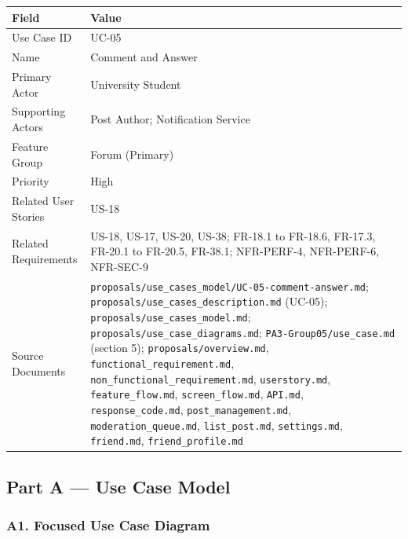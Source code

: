 \documentclass[12pt]{article}
\renewcommand{\baselinestretch}{1.5}
\begin{document}
\begingroup
\small
\renewcommand{\baselinestretch}{1.0}\selectfont
\renewcommand{\arraystretch}{1.15}
\setlength{\tabcolsep}{6pt}
\begin{longtable}{|>{\raggedright\arraybackslash}p{}|>{\raggedright\arraybackslash}p{}|}
\hline
\textbf{Field} & \textbf{Value} \\ \hline
\endhead
Use Case ID & UC-05 \\ \hline
Name & Comment and Answer \\ \hline
Primary Actor & University Student \\ \hline
Supporting Actors & Post Author; Notification Service \\ \hline
Feature Group & Forum (Primary) \\ \hline
Priority & High \\ \hline
Related User Stories & US-18 \\ \hline
Related Requirements & US-18, US-17, US-20, US-38; FR-18.1 to FR-18.6, FR-17.3, FR-20.1 to FR-20.5, FR-38.1; NFR-PERF-4, NFR-PERF-6, NFR-SEC-9 \\ \hline
Source Documents & \texttt{proposals/use\_cases\_model/UC-05-comment-answer.md}; \texttt{proposals/use\_cases\_description.md} (UC-05); \texttt{proposals/use\_cases\_model.md}; \texttt{proposals/use\_case\_diagrams.md}; \texttt{PA3-Group05/use\_case.md} (section 5); \texttt{proposals/overview.md}, \texttt{functional\_requirement.md}, \texttt{non\_functional\_requirement.md}, \texttt{userstory.md}, \texttt{feature\_flow.md}, \texttt{screen\_flow.md}, \texttt{API.md}, \texttt{response\_code.md}, \texttt{post\_management.md}, \texttt{moderation\_queue.md}, \texttt{list\_post.md}, \texttt{settings.md}, \texttt{friend.md}, \texttt{friend\_profile.md} \\ \hline
\end{longtable}
\endgroup
\par\medskip

\hypertarget{sec:part-a-use-case-model}{}
\subsection*{Part A --- Use Case Model}
\par\medskip

\hypertarget{sec:a1-focused-use-case-diagram}{}
\subsubsection*{A1. Focused Use Case Diagram}
\par\medskip
\end{document}
